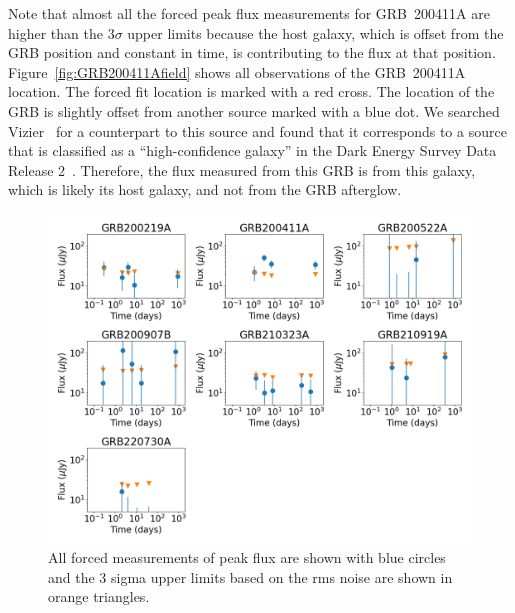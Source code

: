 \documentclass[12pt]{article}
\begin{document}
Note that almost all the forced peak flux measurements for GRB~200411A are higher than the $3\sigma$ upper limits because the host galaxy, which is offset from the GRB position and constant in time, is contributing to the flux at that position. Figure~\ref{fig:GRB200411Afield} shows all observations of the GRB~200411A location. The forced fit location is marked with a red cross. The location of the GRB is slightly offset from another source marked with a blue dot. We searched Vizier~\citep{vizier} for a counterpart to this source and found that it corresponds to a source that is classified as a ``high-confidence galaxy'' in the Dark Energy Survey Data Release 2~\citep{Abbott_2021}. Therefore, the flux measured from this GRB is from this galaxy, which is likely its host galaxy, and not from the GRB afterglow.





\begin{figure}
	\includegraphics[width=\textwidth]{plotboth.png}
	\caption{All forced measurements of peak flux are shown with blue circles and the 3 sigma upper limits based on the rms noise are shown in orange triangles.}
	\label{fig:allmeasurements}
\end{figure}
\end{document}

